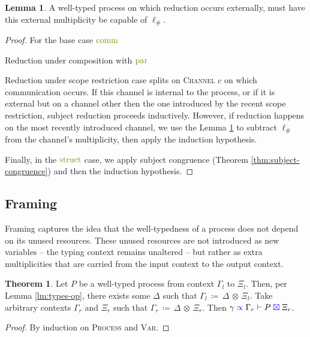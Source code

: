 \documentclass[a4paper,UKenglish,cleveref, autoref, thm-restate,authorcolumns]{lipics-v2019}
\theoremstyle{definition}
\newtheorem{nitheorem}[theorem]{Theorem}
\newtheorem{nilemma}[theorem]{Lemma}
\newcommand{\type}[1]{\textcolor{blue}{\operatorname{#1}}}
\newcommand{\constr}[1]{\textcolor{olive}{\operatorname{#1}}}
\newcommand{\opctx}[3]{#1 \, \coloneqq \, #2 \, \otimes \, #3}
\newcommand{\types}[4]{#1 \; \type{\propto} \; #2 \; \type{\vdash} \; #3 \; \type{\boxtimes} \; #4}
\begin{document}
\begin{nilemma}
  \label{lm:comm-capable}
  A well-typed process on which reduction occurs externally, must have this external multiplicity be capable of $\ell_\#$.
\end{nilemma}
  
\begin{proof}
  For the base case $\constr{comm}$ \todo{}

  Reduction under composition with $\constr{par}$ \todo{}

  Reduction under scope restriction case splits on \textsc{Channel} $c$ on which communication occurs.
  If this channel is internal to the process, or if it is external but on a channel other then the one introduced by the recent scope restriction, subject reduction proceeds inductively.
  However, if reduction happens on the most recently introduced channel, we use the Lemma \ref{lm:comm-capable} to subtract $\ell_\#$ from the channel's multiplicity, then apply the induction hypothesis.

  Finally, in the $\constr{struct}$ case, we apply subject congruence (Theorem \ref{thm:subject-congruence}) and then the induction hypothesis.
  
  

\end{proof}

\subsection{Framing}

Framing captures the idea that the well-typedness of a process does not depend on its unused resources.
These unused resources are not introduced as new variables -- the typing context remains unaltered -- but rather as extra multiplicities that are carried from the input context to the output context.

\begin{nitheorem}
  Let $P$ be a well-typed process from context $\Gamma_l$ to $\Xi_l$.
  Then, per Lemma \ref{lm:types-op}, there exists some $\Delta$ such that $\opctx{\Gamma_l}{\Delta}{\Xi_l}$.
  Take arbitrary contexts $\Gamma_r$ and $\Xi_r$ such that $\opctx{\Gamma_r}{\Delta}{\Xi_r}$.
  Then $\types{\gamma}{\Gamma_r}{P}{\Xi_r}$.
\end{nitheorem}
\begin{proof}
  By induction on \textsc{Process} and \textsc{Var}.
\end{proof}
\end{document}
